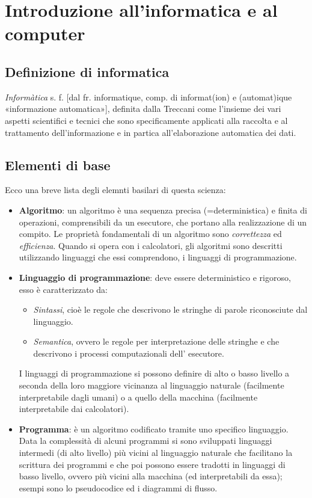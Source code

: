 \chapter{Introduzione all'informatica e al computer}
\section{Definizione di informatica}
\textit{Informàtica} s. f. [dal fr. informatique, comp. di informat(ion) e (automat)ique «informazione automatica»], definita dalla Treccani come l’insieme dei vari aspetti scientifici e tecnici che sono specificamente applicati alla raccolta e al trattamento dell’informazione e in partica all’elaborazione automatica dei dati.\\
\section{Elementi di base}
Ecco una breve lista degli elemnti basilari di questa scienza:
\begin{itemize}
	\item\textbf{Algoritmo}: un algoritmo è una sequenza precisa (=deterministica) e finita di operazioni, comprensibili da un esecutore, che portano alla realizzazione di un compito.
	Le proprietà fondamentali di un algoritmo sono \textit{correttezza} ed \textit{efficienza}. Quando si opera con i calcolatori, gli algoritmi sono descritti utilizzando linguaggi che essi comprendono, i linguaggi di programmazione. 

	\item\textbf{Linguaggio di programmazione}: deve essere deterministico e rigoroso, esso è caratterizzato da: 
	\begin{itemize}
	    \item\textit{Sintassi}, cioè le regole che descrivono le stringhe di parole riconosciute dal linguaggio.
	    \item\textit{Semantica}, ovvero le regole per interpretazione delle stringhe e che descrivono i processi computazionali dell’ esecutore.
	\end{itemize}
    I linguaggi di programmazione si possono definire di alto o basso livello a seconda della loro maggiore vicinanza al linguaggio naturale (facilmente interpretabile dagli umani) o a quello della macchina (facilmente interpretabile dai calcolatori).

	\item\textbf{Programma}: è un algoritmo codificato tramite uno specifico linguaggio. 
	Data la complessità di alcuni programmi si sono sviluppati linguaggi intermedi (di alto livello) più vicini al linguaggio naturale che facilitano la scrittura dei programmi e che poi possono essere tradotti in linguaggi di basso livello, ovvero più vicini alla macchina (ed interpretabili da essa); esempi sono lo pseudocodice ed i diagrammi di flusso.
\end{itemize}

